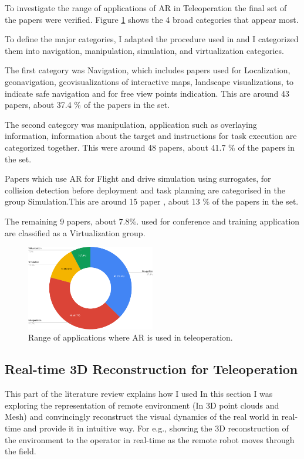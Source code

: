 To investigate the range of applications of AR in Teleoperation the final set of the papers were verified. Figure \ref{fig:range of applications} shows the 4 broad categories that appear most.
 
To define the  major categories, I adapted the procedure used in \cite{7912316} and I categorized them into navigation, manipulation, simulation, and virtualization categories.
 
The first category was Navigation, which includes papers used for Localization, geonavigation, geovisualizations of interactive maps, landscape visualizations, to indicate safe navigation and for free view points indication. This are around 43 papers, about 37.4 $\%$ of the papers in the set.
 
The second category was manipulation, application such as overlaying information, information about the target and instructions for task execution are categorized together. This were around 48 papers, about 41.7 $\%$ of the papers in the set.
 
Papers which use AR for Flight and drive simulation using surrogates, for collision detection before deployment and task planning are categorised in the group Simulation.This are around 15 paper , about 13 $\%$ of the papers in the set.
 
The remaining 9 papers, about 7.8$\%$. used for conference and training application are classified as a Virtualization group.
 
\begin{figure}[h]
    \centering
    \includegraphics[width=0.5\textwidth]{images/chart.png}
    \caption{Range of applications where AR is used in teleoperation.}
    \label{fig:range of applications}
\end{figure}

\subsection{Real-time 3D Reconstruction for Teleoperation}

This part of the literature review explains how I used In this section I was exploring the representation of remote environment (In 3D point clouds and Mesh) and convincingly reconstruct the visual dynamics of the real world in real-time and provide it in intuitive way. For e.g., showing the 3D reconstruction of the environment to the operator in real-time as the remote robot moves through the field.

